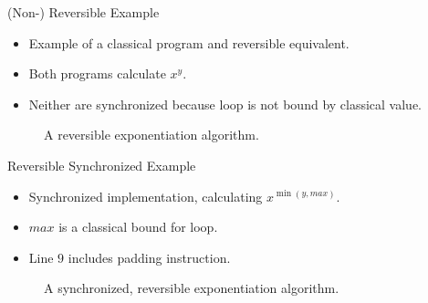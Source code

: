 \begin{frame}{(Non-) Reversible Example}
    \begin{itemize}
        \item Example of a classical program and reversible equivalent.
        \item Both programs calculate $x^y$. 
        \item Neither are synchronized because loop is not bound by classical value.
    \end{itemize}
    \begin{figure}[htp]
        \centering     
        \begin{minipage}{.40\textwidth}
            
            \caption{A non-reversible exponentiation algorithm.}
            \label{fig:qcm_not_reverse}
        \end{minipage}
        \hfill
        \begin{minipage}{.50\textwidth}
            
            \caption{A reversible exponentiation algorithm.}    
            \label{fig:qcm_reverse}
        \end{minipage}
    \end{figure}
\end{frame}

\begin{frame}{Reversible Synchronized Example}
    \begin{itemize}
        \item Synchronized implementation, calculating $x^{\min(y, max)}$.
        \item $max$ is a classical bound for loop.
        \item Line $9$ includes padding instruction.
    \end{itemize}
    \begin{figure}[htp]
        \centering     
        
        \caption{A synchronized, reversible exponentiation algorithm.}
        \label{fig:qcm_sync}
    \end{figure}
\end{frame}